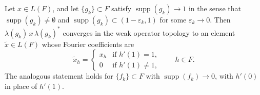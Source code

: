 \documentclass[10pt,a4paper]{amsart}
\newcommand{\supp}{\operatorname{supp}}
\begin{document}
\begin{lemma}\label{lem:boundary}
Let $x \in L(F)$, and let $\{g_k\} \subset F$ satisfy $\supp(g_k) \to 1$ in the sense that $\supp(g_k) \neq \emptyset$ and $\supp(g_k) \subset (1-\varepsilon_k, 1)$ for some $\varepsilon_k \to 0$. Then $\lambda(g_k)\, x\, \lambda(g_k)^*$ converges in the weak operator topology to an element $\tilde{x} \in L(F)$ whose Fourier coefficients are
\[
\tilde{x}_h = \begin{cases} x_h & \text{if } h'(1) = 1, \\ 0 & \text{if } h'(1) \neq 1, \end{cases} \qquad h \in F.
\]
The analogous statement holds for $\{f_k\} \subset F$ with $\supp(f_k) \to 0$, with $h'(0)$ in place of $h'(1)$.
\end{lemma}
\end{document}

